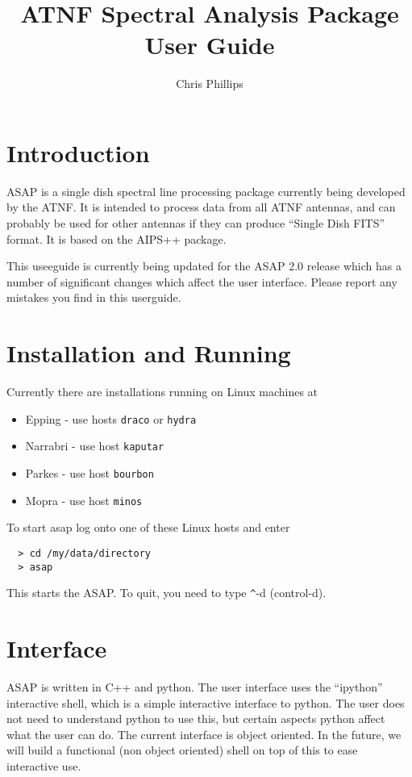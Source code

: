 \documentclass[11pt]{article}
\title{ATNF Spectral Analysis Package\\User Guide }
\author{Chris Phillips}
\begin{document}
\maketitle

\section{Introduction}

ASAP is a single dish spectral line processing package currently being
developed by the ATNF. It is intended to process data from all ATNF
antennas, and can probably be used for other antennas if they can
produce ``Single Dish FITS'' format. It is based on the AIPS++
package.

This useeguide is currently being updated for the ASAP 2.0 release
which has a number of significant changes which affect the user
interface. Please report any mistakes you find in this userguide.

\section{Installation and Running}

Currently there are installations running on Linux machines at

\begin{itemize}
\item Epping - use hosts {\tt draco} or {\tt hydra}
\item Narrabri - use host {\tt kaputar}
\item Parkes - use host {\tt bourbon}
\item Mopra - use host {\tt minos}
\end{itemize}

To start asap log onto one of these Linux hosts and enter

\begin{verbatim}
  > cd /my/data/directory
  > asap
\end{verbatim}

This starts the ASAP. To quit, you need to type \verb+^+-d
(control-d).

\section{Interface}

ASAP is written in C++ and python. The user interface uses the
``ipython'' interactive shell, which is a simple interactive interface
to python. The user does not need to understand python to use this,
but certain aspects python affect what the user can do.  The current
interface is object oriented.  In the future, we will build a
functional (non object oriented) shell on top of this to ease
interactive use.
\end{document}
